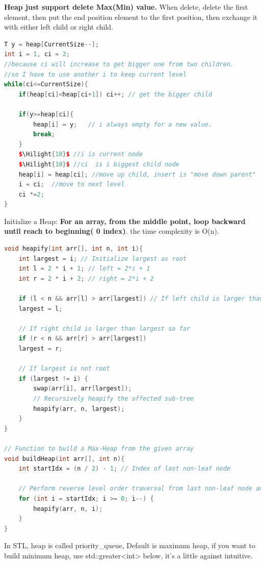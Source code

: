 \documentclass[a4paper,11pt,twoside]{book}
\newcommand{\Hilight}[1]{\makebox[0pt][l]{\color{yellow}\rule[-3pt]{#1em}{11pt}}}
\begin{document}
\par \textbf{Heap just support delete Max(Min) value.} When delete, delete the first element, then put the end position element to the first position, then exchange it with either left child or right child. 
\begin{lstlisting}[frame=single, language=c++, mathescape=true]
T y = heap[CurrentSize--];
int i = 1, ci = 2;
//because ci will increase to get bigger one from two children.
//so I have to use another i to keep current level
while(ci<=CurrentSize){
	if(heap[ci]<heap[ci+1]) ci++; // get the bigger child
	
	if(y>=heap[ci]{
		heap[i] = y;   // i always empty for a new value. 
		break; 
	}
	$\Hilight{10}$ //i is current node
	$\Hilight{10}$ //ci  is i biggest child node
	heap[i] = heap[ci]; //move up child, insert is "move down parent"
	i = ci;  //move to next level
	ci *=2;
}	
\end{lstlisting}



\par Initialize a Heap: \textbf{For an array, from the middle point, loop backward until reach to beginning( 0 index)}. the time complexity is O(n). 

\begin{lstlisting}[frame=single, language=c++]
void heapify(int arr[], int n, int i){
	int largest = i; // Initialize largest as root
	int l = 2 * i + 1; // left = 2*i + 1
	int r = 2 * i + 2; // right = 2*i + 2
	
	if (l < n && arr[l] > arr[largest]) // If left child is larger than root
	largest = l;
	
	// If right child is larger than largest so far
	if (r < n && arr[r] > arr[largest])
	largest = r;
	
	// If largest is not root
	if (largest != i) {
		swap(arr[i], arr[largest]);		
		// Recursively heapify the affected sub-tree
		heapify(arr, n, largest);
	}
}

// Function to build a Max-Heap from the given array
void buildHeap(int arr[], int n){
	int startIdx = (n / 2) - 1; // Index of last non-leaf node
	
	// Perform reverse level order traversal from last non-leaf node and heapify each node
	for (int i = startIdx; i >= 0; i--) {
		heapify(arr, n, i);
	}
}
\end{lstlisting}



\par In STL, heap is called priority\_queue, Default is maximum heap, if you want to build minimum heap, use std::greater<int> below, it's a little against intuitive. 
\end{document}
